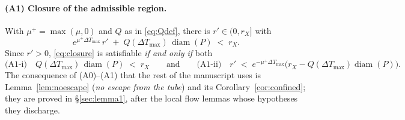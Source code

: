 \documentclass[11pt]{article}
\theoremstyle{remark}\newtheorem{remark}{Remark}
\begin{document}
\paragraph{(A1) Closure of the admissible region.}
With $\mu^{+}=\max(\mu,0)$ and $Q$ as in \eqref{eq:Qdef}, there is $r'\in(0,r_X]$ with
\begin{equation}
e^{\mu^{+}\Delta T_{\max}}\,r' \;+\; Q(\Delta T_{\max})\,\operatorname{diam}(P)\;<\;r_X .
\label{eq:closure}
\end{equation}
Since $r'>0$, \eqref{eq:closure} is satisfiable \emph{if and only if} both
\begin{equation}
\text{(A1-i)}\quad Q(\Delta T_{\max})\,\operatorname{diam}(P)\;<\;r_X
\qquad\text{and}\qquad
\text{(A1-ii)}\quad r'\;<\;e^{-\mu^{+}\Delta T_{\max}}\Big(r_X-Q(\Delta T_{\max})\operatorname{diam}(P)\Big).
\label{eq:closure_two}
\end{equation}
The consequence of (A0)--(A1) that the rest of the manuscript uses is Lemma~\ref{lem:noescape} (\emph{no escape from the tube}) and its Corollary~\ref{cor:confined}; they are proved in \S\ref{sec:lemma1}, after the local flow lemmas whose hypotheses they discharge.
\end{document}
